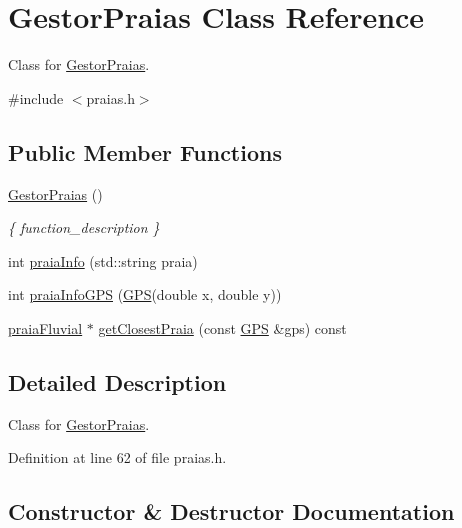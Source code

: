 \hypertarget{classGestorPraias}{}\section{Gestor\+Praias Class Reference}
\label{classGestorPraias}


Class for \hyperlink{classGestorPraias}{Gestor\+Praias}.  




{\ttfamily \#include $<$praias.\+h$>$}

\subsection*{Public Member Functions}
\begin{DoxyCompactItemize}
\item 
\hyperlink{classGestorPraias_a75246833391190416769acc72c892c48}{Gestor\+Praias} ()
\begin{DoxyCompactList}\small\item\em \{ function\+\_\+description \} \end{DoxyCompactList}\item 
int \hyperlink{classGestorPraias_adf3bf03545a568eadb5966b445b1dadb}{praia\+Info} (std\+::string praia)
\item 
int \hyperlink{classGestorPraias_a4b4ab76a5873745bb7d60326d9c13362}{praia\+Info\+G\+PS} (\hyperlink{classGPS}{G\+PS}(double x, double y))
\item 
\hyperlink{classpraiaFluvial}{praia\+Fluvial} $\ast$ \hyperlink{classGestorPraias_a0b62f5b570fc949acd0bc0a589a51f39}{get\+Closest\+Praia} (const \hyperlink{classGPS}{G\+PS} \&gps) const 
\end{DoxyCompactItemize}


\subsection{Detailed Description}
Class for \hyperlink{classGestorPraias}{Gestor\+Praias}. 

Definition at line 62 of file praias.\+h.



\subsection{Constructor \& Destructor Documentation}
